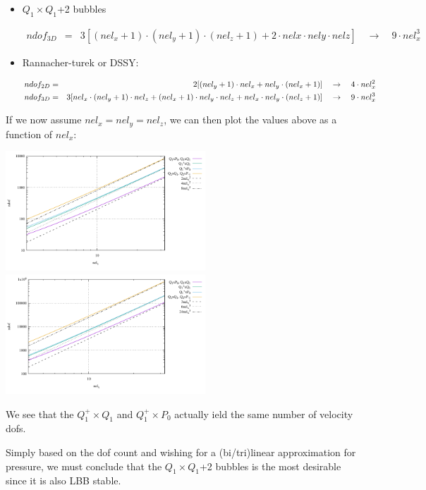 \begin{itemize}
\item $Q_1 \times Q_1$+2 bubbles

\begin{eqnarray}
ndof_{3D}&=& 3[(nel_x+1) \cdot (nel_y+1) \cdot  (nel_z+1) + 2\cdot nelx\cdot nely \cdot nelz]
\quad \rightarrow \quad 9 \cdot nel_x^3 \nonumber
\end{eqnarray}


\item Rannacher-turek or DSSY:

\begin{eqnarray}
ndof_{2D}&=& 2[(nel_y+1) \cdot nel_x+nel_y\cdot(nel_x+1)  ] 
\quad\rightarrow \quad 4 \cdot nel_x^2 \nonumber\nonumber\\
ndof_{3D}&=& 3[ nel_x\cdot (nel_y+1)\cdot nel_z + (nel_x+1) \cdot nel_y\cdot nel_z  +nel_x\cdot nel_y\cdot (nel_z+1) ]  
\quad \rightarrow \quad 9 \cdot nel_x^3 \nonumber
\end{eqnarray}
 

\end{itemize}


If we now assume $nel_x=nel_y=nel_z$, we can then plot the values above as a function of $nel_x$:
\begin{center}
\includegraphics[width=7.5cm]{images/elements/ndof2D.pdf}
\includegraphics[width=7.5cm]{images/elements/ndof3D.pdf}
\end{center}

We see that the $Q_1^+\times Q_1$ and $Q_1^+ \times P_0$ actually 
ield the same number of velocity dofs. 

Simply based on the dof count and wishing for a (bi/tri)linear approximation 
for pressure, we must conclude that the $Q_1\times Q_1$+2 bubbles is the most desirable 
since it is also LBB stable.

